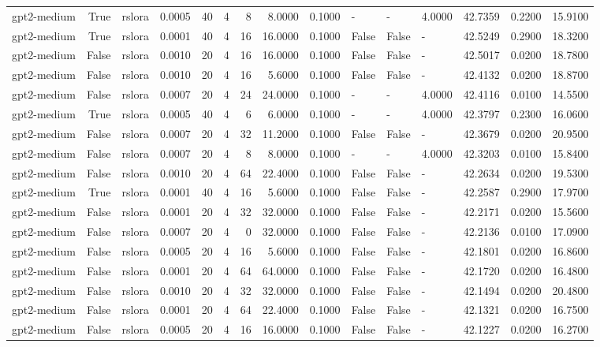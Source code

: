 \begin{tabular}{lrlrrrrrrlllrrr}
gpt2-medium & True & rslora & 0.0005 & 40 & 4 & 8 & 8.0000 & 0.1000 & - & - & 4.0000 & 42.7359 & 0.2200 & 15.9100 \\
gpt2-medium & True & rslora & 0.0001 & 40 & 4 & 16 & 16.0000 & 0.1000 & False & False & - & 42.5249 & 0.2900 & 18.3200 \\
gpt2-medium & False & rslora & 0.0010 & 20 & 4 & 16 & 16.0000 & 0.1000 & False & False & - & 42.5017 & 0.0200 & 18.7800 \\
gpt2-medium & False & rslora & 0.0010 & 20 & 4 & 16 & 5.6000 & 0.1000 & False & False & - & 42.4132 & 0.0200 & 18.8700 \\
gpt2-medium & False & rslora & 0.0007 & 20 & 4 & 24 & 24.0000 & 0.1000 & - & - & 4.0000 & 42.4116 & 0.0100 & 14.5500 \\
gpt2-medium & True & rslora & 0.0005 & 40 & 4 & 6 & 6.0000 & 0.1000 & - & - & 4.0000 & 42.3797 & 0.2300 & 16.0600 \\
gpt2-medium & False & rslora & 0.0007 & 20 & 4 & 32 & 11.2000 & 0.1000 & False & False & - & 42.3679 & 0.0200 & 20.9500 \\
gpt2-medium & False & rslora & 0.0007 & 20 & 4 & 8 & 8.0000 & 0.1000 & - & - & 4.0000 & 42.3203 & 0.0100 & 15.8400 \\
gpt2-medium & False & rslora & 0.0010 & 20 & 4 & 64 & 22.4000 & 0.1000 & False & False & - & 42.2634 & 0.0200 & 19.5300 \\
gpt2-medium & True & rslora & 0.0001 & 40 & 4 & 16 & 5.6000 & 0.1000 & False & False & - & 42.2587 & 0.2900 & 17.9700 \\
gpt2-medium & False & rslora & 0.0001 & 20 & 4 & 32 & 32.0000 & 0.1000 & False & False & - & 42.2171 & 0.0200 & 15.5600 \\
gpt2-medium & False & rslora & 0.0007 & 20 & 4 & 0 & 32.0000 & 0.1000 & False & False & - & 42.2136 & 0.0100 & 17.0900 \\
gpt2-medium & False & rslora & 0.0005 & 20 & 4 & 16 & 5.6000 & 0.1000 & False & False & - & 42.1801 & 0.0200 & 16.8600 \\
gpt2-medium & False & rslora & 0.0001 & 20 & 4 & 64 & 64.0000 & 0.1000 & False & False & - & 42.1720 & 0.0200 & 16.4800 \\
gpt2-medium & False & rslora & 0.0010 & 20 & 4 & 32 & 32.0000 & 0.1000 & False & False & - & 42.1494 & 0.0200 & 20.4800 \\
gpt2-medium & False & rslora & 0.0001 & 20 & 4 & 64 & 22.4000 & 0.1000 & False & False & - & 42.1321 & 0.0200 & 16.7500 \\
gpt2-medium & False & rslora & 0.0005 & 20 & 4 & 16 & 16.0000 & 0.1000 & False & False & - & 42.1227 & 0.0200 & 16.2700 \\

\end{tabular}
